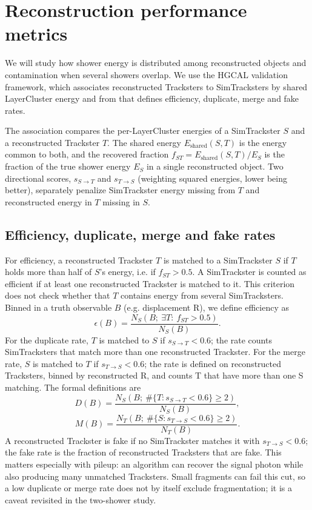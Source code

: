 \section{Reconstruction performance metrics}
\label{sec:metrics}

We will study how shower energy is distributed among reconstructed objects and contamination when several showers overlap.
We use the HGCAL validation framework, which associates reconstructed
Tracksters to SimTracksters by shared LayerCluster energy and from that defines efficiency, duplicate, merge and fake rates.

The association compares the per-LayerCluster energies of a SimTrackster $S$ and
a reconstructed Trackster $T$. The shared energy $E_{\mathrm{shared}}(S,T)$ is
the energy common to both, and the recovered fraction
$f_{ST}=E_{\mathrm{shared}}(S,T)/E_S$ is the fraction of the true shower energy
$E_S$ in a single reconstructed object. Two directional scores,
$s_{S\to T}$ and $s_{T\to S}$ (weighting squared energies, lower being better),
separately penalize SimTrackster energy missing from $T$ and reconstructed energy
in $T$ missing in $S$.

\subsection{Efficiency, duplicate, merge and fake rates}

For efficiency, a reconstructed Trackster $T$ is matched to a SimTrackster $S$
if $T$ holds more than half of $S$'s energy, i.e. if $f_{ST}>0.5$. A
SimTrackster is counted as efficient if at least one reconstructed Trackster is
matched to it. This criterion does not check whether that $T$ contains energy
from several SimTracksters.
Binned in a truth observable $B$ (e.g. displacement R), we define efficiency as
\begin{equation}
  \epsilon(B)=\frac{N_S(B;\ \exists T:\ f_{ST}>0.5)}{N_S(B)}.
  \label{eq:efficiency}
\end{equation}
For the duplicate rate, $T$ is matched to $S$ if $s_{S\to T}<0.6$; the rate
counts SimTracksters that match more than one reconstructed Trackster. For the
merge rate, $S$ is matched to $T$ if $s_{T\to S}<0.6$; the rate is defined on
reconstructed Tracksters, binned by reconstructed R, and counts T that have
 more than one S matching. The formal definitions are
\begin{equation}
  D(B)=\frac{N_S(B;\ \#\{T:s_{S\to T}<0.6\}\geq2)}{N_S(B)},
  \label{eq:duplicaterate}
\end{equation}
\begin{equation}
  M(B)=\frac{N_T(B;\ \#\{S:s_{T\to S}<0.6\}\geq2)}{N_T(B)}.
  \label{eq:mergerate}
\end{equation}
A reconstructed Trackster is fake if no SimTrackster matches it with
$s_{T\to S}<0.6$; the fake rate is the fraction of reconstructed Tracksters
that are fake. This matters especially with pileup: an algorithm can recover
the signal photon while also producing many unmatched Tracksters.
Small fragments can fail
this cut, so a low duplicate or merge rate does not by itself exclude
fragmentation; it is a caveat revisited in the two-shower study.

